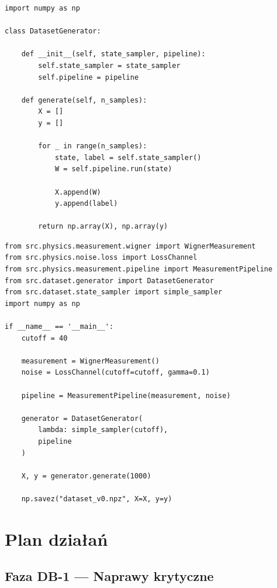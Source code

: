 \documentclass[12pt,a4paper]{article}
\begin{document}
\begin{lstlisting}[caption={\texttt{src/dataset/generator.py} --- generator zbiorów danych.}, label={lst:generator}]
import numpy as np

class DatasetGenerator:

    def __init__(self, state_sampler, pipeline):
        self.state_sampler = state_sampler
        self.pipeline = pipeline

    def generate(self, n_samples):
        X = []
        y = []

        for _ in range(n_samples):
            state, label = self.state_sampler()
            W = self.pipeline.run(state)

            X.append(W)
            y.append(label)

        return np.array(X), np.array(y)
\end{lstlisting}

\begin{lstlisting}[caption={\texttt{scripts/generate\_dataset.py} --- skrypt generujący zbiór danych.}, label={lst:script}]
from src.physics.measurement.wigner import WignerMeasurement
from src.physics.noise.loss import LossChannel
from src.physics.measurement.pipeline import MeasurementPipeline
from src.dataset.generator import DatasetGenerator
from src.dataset.state_sampler import simple_sampler
import numpy as np

if __name__ == '__main__':
    cutoff = 40

    measurement = WignerMeasurement()
    noise = LossChannel(cutoff=cutoff, gamma=0.1)

    pipeline = MeasurementPipeline(measurement, noise)

    generator = DatasetGenerator(
        lambda: simple_sampler(cutoff),
        pipeline
    )

    X, y = generator.generate(1000)

    np.savez("dataset_v0.npz", X=X, y=y)
\end{lstlisting}

\section{Plan działań}

\subsection{Faza DB-1 --- Naprawy krytyczne}
\end{document}
